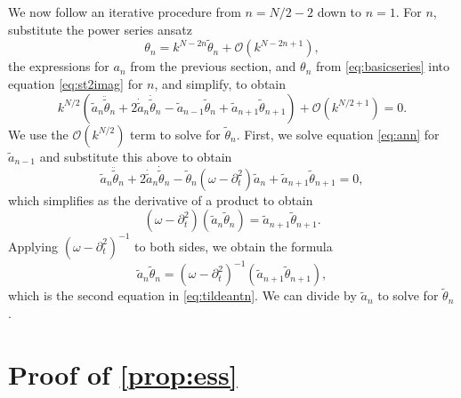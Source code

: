 \documentclass[11pt,reqno]{amsart}
\begin{document}
We now follow an iterative procedure from $n=N/2-2$ down to $n=1$. For $n$, substitute the power series ansatz
\[
\theta_{n} = k^{N-2n} \widetilde{\theta}_{n} + \mathcal{O}(k^{N-2n+1}),
\]
the expressions for $a_n$ from the previous section, and $\theta_n$ from \cref{eq:basicseries} into equation \cref{eq:st2imag} for $n$, and simplify, to obtain
\[
k^{N/2} \left( \widetilde{a}_n \ddot{\widetilde{\theta}}_n + 2 \dot{\widetilde{a}}_n \dot{\widetilde{\theta}}_n
- \widetilde{a}_{n-1} \widetilde{\theta}_n + \widetilde{a}_{n+1}\widetilde{\theta}_{n+1} \right) + \mathcal{O}\left(k^{N/2+1}\right) = 0.
\]
We use the $\mathcal{O}(k^{N/2})$ term to solve for $\widetilde{\theta}_{n}$. First, we solve equation \cref{eq:ann} for $\widetilde{a}_{n-1}$ and substitute this above to obtain
\[
\widetilde{a}_n \ddot{\widetilde{\theta}}_n + 2 \dot{\widetilde{a}}_n \dot{\widetilde{\theta}}_n
- \widetilde{\theta}_n (\omega - \partial_t^2) \widetilde{a}_n + \widetilde{a}_{n+1} \widetilde{\theta}_{n+1} = 0,
\]
which simplifies as the derivative of a product to obtain
\[
(\omega - \partial_t^2)\left( \widetilde{a}_n \widetilde{\theta}_n \right) = \widetilde{a}_{n+1} \widetilde{\theta}_{n+1}.
\]
Applying $(\omega - \partial_t^2)^{-1}$ to both sides, we obtain the formula
\begin{equation}\label{an2th}
\widetilde{a}_n \widetilde{\theta}_n = (\omega - \partial_t^2)^{-1} \left( \widetilde{a}_{n+1} \widetilde{\theta}_{n+1} \right),
\end{equation}
which is the second equation in \cref{eq:tildeantn}. We can divide by $\widetilde{a}_n$ to solve for $\widetilde{\theta}_n$. 

\section{Proof of \texorpdfstring{\cref{prop:ess}}{Proposition 1}}\label{app:prop1proof}
\end{document}
